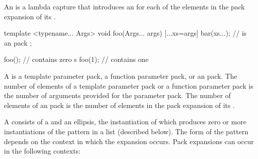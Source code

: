 \documentclass{wg21}
\begin{document}
\pnum
An 
is a lambda capture that introduces an 
for each of the elements in the pack expansion of its .
\begin{example}
    \begin{codeblock}
        template <typename... Args>
        void foo(Args... args) {
            [...xs=args]{
                bar(xs...);             //  is an  pack
            };
        }

        foo();                          //  contains zero s
        foo(1);                         //  contains one 
    \end{codeblock}
\end{example}

\pnum
A  is
a template parameter pack,
a function parameter pack,
or an  pack.
The number of elements of a template parameter pack
or a function parameter pack
is the number of arguments provided for the parameter pack.
The number of elements of an  pack
is the number of elements in the pack expansion of its .

\pnum
{}%
A 
consists of a  and an ellipsis, the instantiation of which
produces zero or more instantiations of the pattern in a list (described below).
The form of the pattern
depends on the context in which the expansion occurs. Pack
expansions can occur in the following contexts:
\end{document}
